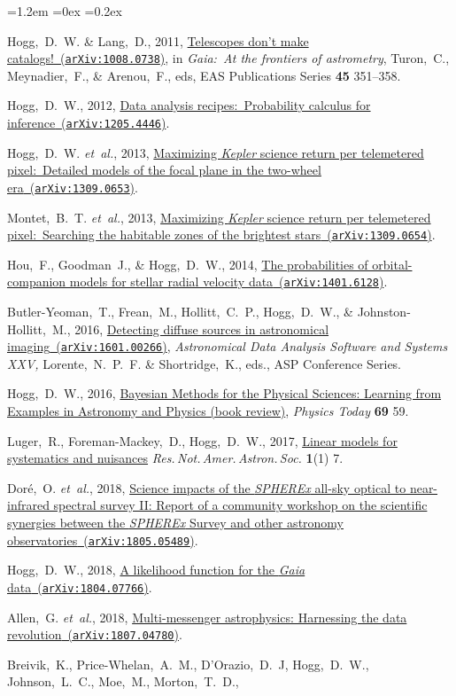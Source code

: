 \documentclass[10pt,letterpaper]{article}
\newcommand{\foreign}[1]{\textsl{#1}}
\newcommand{\etal}{\foreign{et~al.}}
\newcommand{\project}[1]{\textsl{#1}}
\newcommand{\doi}[2]{\href{http://dx.doi.org/#1}{{#2}}}
\newcommand{\arxiv}[2]{\href{http://arxiv.org/abs/#1}{{#2}\ (\texttt{arXiv:#1})}}
\newcounter{refpubnum}
\newcommand{\hogglist}{%
    \rightmargin=0in
    \leftmargin=1.2em
    \topsep=0ex
    \partopsep=0pt
    \itemsep=0.2ex
    \parsep=0pt
    \itemindent=-1.0\leftmargin
    \listparindent=0.0\leftmargin
    \settowidth{\labelsep}{~}
    \usecounter{refpubnum}
  }
\begin{document}
\begin{list}{}{\hogglist}
\item
Hogg,~D.~W. \& Lang,~D., 2011,
\arxiv{1008.0738}{Telescopes don't make catalogs!},
in \textit{Gaia:\ At the frontiers of astrometry}, Turon,~C., Meynadier,~F., \& Arenou,~F., eds,
EAS Publications Series \textbf{45} 351--358.
\item
Hogg,~D.~W., 2012,
\arxiv{1205.4446}{Data analysis recipes:\ Probability calculus for inference}.
\item
Hogg,~D.~W. \etal, 2013,
\arxiv{1309.0653}{Maximizing \project{Kepler} science return per telemetered pixel:\ Detailed models of the focal plane in the two-wheel era}.
\item
Montet,~B.~T. \etal, 2013,
\arxiv{1309.0654}{Maximizing \project{Kepler} science return per telemetered pixel:\ Searching the habitable zones of the brightest stars}.
\item
Hou,~F., Goodman~J., \& Hogg,~D.~W., 2014,
\arxiv{1401.6128}{The probabilities of orbital-companion models for stellar radial velocity data}.
\item
Butler-Yeoman,~T., Frean,~M., Hollitt,~C.~P., Hogg,~D.~W., \& Johnston-Hollitt,~M., 2016,
\arxiv{1601.00266}{Detecting diffuse sources in astronomical imaging},
\textit{Astronomical Data Analysis Software and Systems XXV,} 
Lorente,~N.~P.~F. \& Shortridge,~K., eds., 
ASP Conference Series. %
\item
Hogg,~D.~W., 2016,
\doi{10.1063/PT.3.3200}{Bayesian Methods for the Physical Sciences: Learning from Examples in Astronomy and Physics (book review)},
\textit{Physics Today} \textbf{69} 59.
\item
Luger,~R., Foreman-Mackey,~D., Hogg,~D.~W., 2017,
\doi{10.3847/2515-5172/aa96b5}{Linear models for systematics and nuisances}
\textit{Res.\,Not.\,Amer.\,Astron.\,Soc.} \textbf{1}(1) 7.
\item
Dor\'e,~O. \etal, 2018,
\arxiv{1805.05489}{Science impacts of the \project{SPHEREx} all-sky optical to near-infrared spectral survey II: Report of a community workshop on the scientific synergies between the \project{SPHEREx} Survey and other astronomy observatories}.
\item
Hogg,~D.~W., 2018,
\arxiv{1804.07766}{A likelihood function for the \project{Gaia} data}.
\item
Allen,~G. \etal, 2018,
\arxiv{1807.04780}{Multi-messenger astrophysics: Harnessing the data revolution}.
\item
Breivik,~K., Price-Whelan,~A.~M., D'Orazio,~D.~J, Hogg,~D.~W., Johnson,~L.~C., Moe,~M., Morton,~T.~D.,

\end{list}
\end{document}
